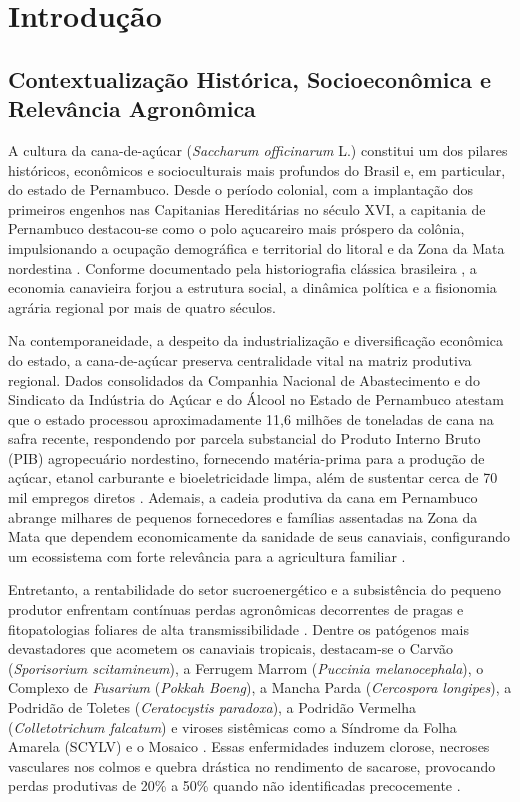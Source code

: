 \chapter{Introdução}
\label{cap:introducao}

\section{Contextualização Histórica, Socioeconômica e Relevância Agronômica}

A cultura da cana-de-açúcar (\textit{Saccharum officinarum} L.) constitui um dos pilares históricos, econômicos e socioculturais mais profundos do Brasil e, em particular, do estado de Pernambuco. Desde o período colonial, com a implantação dos primeiros engenhos nas Capitanias Hereditárias no século XVI, a capitania de Pernambuco destacou-se como o polo açucareiro mais próspero da colônia, impulsionando a ocupação demográfica e territorial do litoral e da Zona da Mata nordestina \cite{freyre2004}. Conforme documentado pela historiografia clássica brasileira \cite{freyre2004,mello2007}, a economia canavieira forjou a estrutura social, a dinâmica política e a fisionomia agrária regional por mais de quatro séculos.

Na contemporaneidade, a despeito da industrialização e diversificação econômica do estado, a cana-de-açúcar preserva centralidade vital na matriz produtiva regional. Dados consolidados da Companhia Nacional de Abastecimento \cite{conab2024cana,conab2025} e do Sindicato da Indústria do Açúcar e do Álcool no Estado de Pernambuco \cite{sindacucar2024} atestam que o estado processou aproximadamente 11,6 milhões de toneladas de cana na safra recente, respondendo por parcela substancial do Produto Interno Bruto (PIB) agropecuário nordestino, fornecendo matéria-prima para a produção de açúcar, etanol carburante e bioeletricidade limpa, além de sustentar cerca de 70 mil empregos diretos \cite{santos2023}. Ademais, a cadeia produtiva da cana em Pernambuco abrange milhares de pequenos fornecedores e famílias assentadas na Zona da Mata que dependem economicamente da sanidade de seus canaviais, configurando um ecossistema com forte relevância para a agricultura familiar \cite{oliveira2024}.

Entretanto, a rentabilidade do setor sucroenergético e a subsistência do pequeno produtor enfrentam contínuas perdas agronômicas decorrentes de pragas e fitopatologias foliares de alta transmissibilidade \cite{mariano2023}. Dentre os patógenos mais devastadores que acometem os canaviais tropicais, destacam-se o Carvão (\textit{Sporisorium scitamineum}), a Ferrugem Marrom (\textit{Puccinia melanocephala}), o Complexo de \textit{Fusarium} (\textit{Pokkah Boeng}), a Mancha Parda (\textit{Cercospora longipes}), a Podridão de Toletes (\textit{Ceratocystis paradoxa}), a Podridão Vermelha (\textit{Colletotrichum falcatum}) e viroses sistêmicas como a Síndrome da Folha Amarela (SCYLV) e o Mosaico \cite{barbedo2019review}. Essas enfermidades induzem clorose, necroses vasculares nos colmos e quebra drástica no rendimento de sacarose, provocando perdas produtivas de 20\% a 50\% quando não identificadas precocemente \cite{mariano2023,conab2025}.

